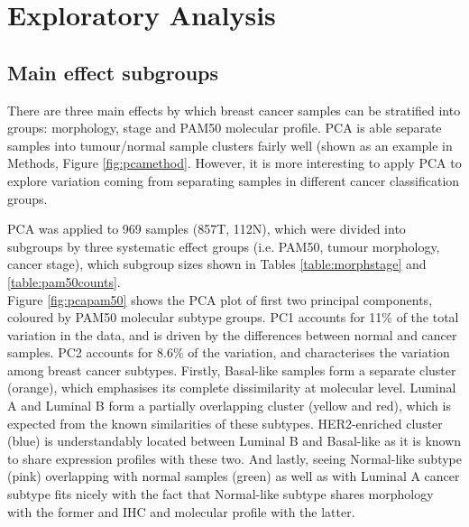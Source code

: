     
\section{Exploratory Analysis}

    
    
    

    
    

    \subsection{Main effect subgroups}

    There are three main effects by which breast cancer samples can be stratified into groups: morphology, stage and PAM50 molecular profile. PCA is able separate samples into tumour/normal sample clusters fairly well (shown as an example in Methods, Figure \ref{fig:pcamethod}. However, it is more interesting to apply PCA to explore variation coming from separating samples in different cancer classification groups.  
    
    PCA was applied to 969 samples (857T, 112N), which were divided into subgroups by three systematic effect groups (i.e. PAM50, tumour morphology, cancer stage), which subgroup sizes shown in Tables \ref{table:morphstage} and \ref{table:pam50counts}. \\
    Figure \ref{fig:pcapam50} shows the PCA plot of first two principal components, coloured by PAM50 molecular subtype groups. PC1 accounts for 11\% of the total variation in the data, and is driven by the differences between normal and cancer samples. PC2 accounts for 8.6\% of the variation, and characterises the variation among breast cancer subtypes. Firstly, Basal-like samples form a separate cluster (orange), which emphasises its complete dissimilarity at molecular level. Luminal A and Luminal B form a partially overlapping cluster (yellow and red), which is expected from the known similarities of these subtypes. HER2-enriched cluster (blue) is understandably located between Luminal B and Basal-like as it is known to share expression profiles with these two. And lastly, seeing Normal-like subtype (pink) overlapping with normal samples (green) as well as with Luminal A cancer subtype fits nicely with the fact that Normal-like subtype shares morphology with the former and IHC and molecular profile with the latter.    
    

